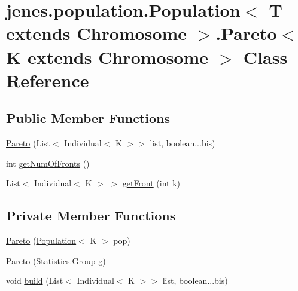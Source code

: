 \hypertarget{classjenes_1_1population_1_1_population_3_01_t_01extends_01_chromosome_01_4_1_1_pareto_3_01_k_01extends_01_chromosome_01_4}{\section{jenes.\-population.\-Population$<$ T extends Chromosome $>$.Pareto$<$ K extends Chromosome $>$ Class Reference}
\label{classjenes_1_1population_1_1_population_3_01_t_01extends_01_chromosome_01_4_1_1_pareto_3_01_k_01extends_01_chromosome_01_4}
}
\subsection*{Public Member Functions}
\begin{DoxyCompactItemize}
\item 
\hyperlink{classjenes_1_1population_1_1_population_3_01_t_01extends_01_chromosome_01_4_1_1_pareto_3_01_k_01extends_01_chromosome_01_4_a912b5564361154ab53b642c1387fb6d8}{Pareto} (List$<$ Individual$<$ K $>$$>$ list, boolean...\-bis)
\item 
int \hyperlink{classjenes_1_1population_1_1_population_3_01_t_01extends_01_chromosome_01_4_1_1_pareto_3_01_k_01extends_01_chromosome_01_4_adc2ce719244d5694e7fee563f4d66dd3}{get\-Num\-Of\-Fronts} ()
\item 
List$<$ Individual$<$ K $>$ $>$ \hyperlink{classjenes_1_1population_1_1_population_3_01_t_01extends_01_chromosome_01_4_1_1_pareto_3_01_k_01extends_01_chromosome_01_4_af8ce7e8db89e0bc4178700eb34395965}{get\-Front} (int k)
\end{DoxyCompactItemize}
\subsection*{Private Member Functions}
\begin{DoxyCompactItemize}
\item 
\hyperlink{classjenes_1_1population_1_1_population_3_01_t_01extends_01_chromosome_01_4_1_1_pareto_3_01_k_01extends_01_chromosome_01_4_a0e57bf4123e1f77b9fac2736483e7269}{Pareto} (\hyperlink{classjenes_1_1population_1_1_population_3_01_t_01extends_01_chromosome_01_4_a0f7b4a9eda8a4dadbc70f8585def56bd}{Population}$<$ K $>$ pop)
\item 
\hyperlink{classjenes_1_1population_1_1_population_3_01_t_01extends_01_chromosome_01_4_1_1_pareto_3_01_k_01extends_01_chromosome_01_4_ad19a5d88b2f536c37ac49dfe940f9f09}{Pareto} (Statistics.\-Group g)
\item 
void \hyperlink{classjenes_1_1population_1_1_population_3_01_t_01extends_01_chromosome_01_4_1_1_pareto_3_01_k_01extends_01_chromosome_01_4_a8deb39cab44789a4d0e80016f499b029}{build} (List$<$ Individual$<$ K $>$$>$ list, boolean...\-bis)
\end{DoxyCompactItemize}
